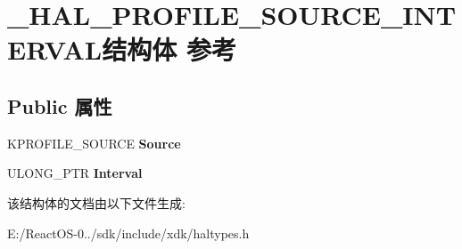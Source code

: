 \hypertarget{struct___h_a_l___p_r_o_f_i_l_e___s_o_u_r_c_e___i_n_t_e_r_v_a_l}{}\section{\+\_\+\+H\+A\+L\+\_\+\+P\+R\+O\+F\+I\+L\+E\+\_\+\+S\+O\+U\+R\+C\+E\+\_\+\+I\+N\+T\+E\+R\+V\+A\+L结构体 参考}
\label{struct___h_a_l___p_r_o_f_i_l_e___s_o_u_r_c_e___i_n_t_e_r_v_a_l}
\subsection*{Public 属性}
\begin{DoxyCompactItemize}
\item 
\mbox{\label{struct___h_a_l___p_r_o_f_i_l_e___s_o_u_r_c_e___i_n_t_e_r_v_a_l_a52b23f424e77a8ef02751755efd9f09f}} 
K\+P\+R\+O\+F\+I\+L\+E\+\_\+\+S\+O\+U\+R\+CE {\bfseries Source}
\item 
\mbox{\label{struct___h_a_l___p_r_o_f_i_l_e___s_o_u_r_c_e___i_n_t_e_r_v_a_l_a43e30e23481413e4976d2d86fec5de8e}} 
U\+L\+O\+N\+G\+\_\+\+P\+TR {\bfseries Interval}
\end{DoxyCompactItemize}


该结构体的文档由以下文件生成\+:\begin{DoxyCompactItemize}
\item 
E\+:/\+React\+O\+S-\/0../sdk/include/xdk/haltypes.\+h\end{DoxyCompactItemize}
